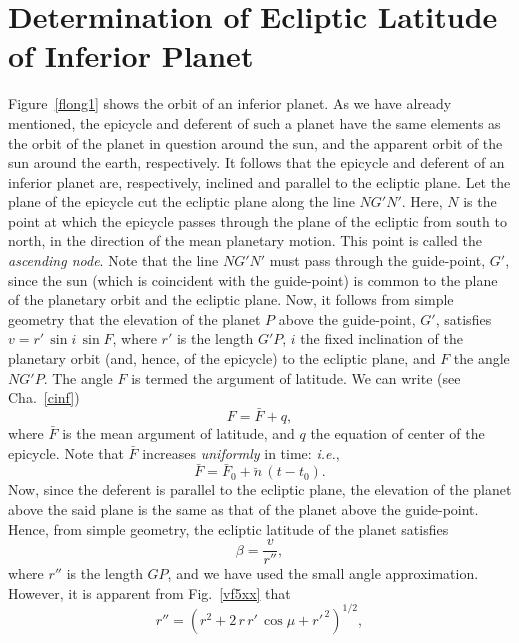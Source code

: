 \section{Determination of Ecliptic Latitude of Inferior Planet}
Figure~\ref{flong1} shows the orbit of an inferior planet. 
As we have already mentioned, the epicycle and deferent of such a planet 
have the same elements as
the orbit of the planet in question  around the sun, and the apparent orbit of the
sun around the earth, respectively. It follows that  the epicycle and deferent of an inferior planet are, respectively,  inclined  and parallel to the ecliptic plane.
 Let the plane of the epicycle cut the
ecliptic plane along the line $NG'N'$. Here, $N$ is the point at which the
epicycle passes through the  plane of the ecliptic from south to north, in the direction of the
mean planetary motion. This point is called the {\em ascending node}. 
Note that the line $NG'N'$ must pass through the guide-point, $G'$, since the
sun (which is coincident with the guide-point)  is common to the plane of the planetary orbit and the ecliptic plane.
Now, it follows from simple geometry that the elevation of the planet $P$ above  the
guide-point, $G'$, satisfies $v= r'\,\sin i\,\sin F$, where $r'$ is the length $G'P$, $i$  the fixed inclination of the
planetary orbit (and, hence, of the epicycle) to the ecliptic plane, and $F$  the angle $NG'P$. The
angle $F$ is termed the argument of latitude. We can write (see Cha.~\ref{cinf})
\begin{equation}
F = \bar{F} + q,
\end{equation}
where $\bar{F}$ is the mean argument of latitude, and $q$ the equation of center of the epicycle. Note that $\bar{F}$
increases {\em uniformly}\/ in time: {\em i.e.},
\begin{equation}
\bar{F}  = \bar{F}_0 + \breve{n}\,(t-t_0).
\end{equation}
 Now, since the deferent is parallel to the ecliptic
plane, the elevation of the planet above the said plane is
the same as that of the planet above the guide-point. Hence, from simple geometry, the ecliptic latitude of the planet satisfies
\begin{equation}
\beta = \frac{v}{r''},
\end{equation}
where $r''$ is the length $GP$, and
we have used the small angle approximation. However, it is apparent from Fig.~\ref{vf5xx} that
\begin{equation}
r'' = (r^2 + 2\,r\,r'\,\cos\mu+ r'^{\,2})^{1/2},
\end{equation}
